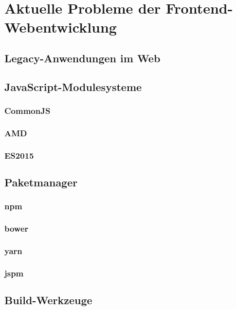 \chapter{Aktuelle Probleme der Frontend-Webentwicklung}
\label{cha:frontend-problems}


\section{Legacy-Anwendungen im Web}
\label{sec:legacy-applications}


\section{JavaScript-Modulesysteme}
\label{sec:js-modulesystems}

\subsection{CommonJS}
\label{sub:commonjs}
\subsection{AMD}
\label{sub:amd}
\subsection{ES2015}
\label{sub:es2015}


\section{Paketmanager}
\label{sec:package-managers}

\subsection{npm}
\label{sub:npm}
\subsection{bower}
\label{sub:bower}
\subsection{yarn}
\label{sub:yarn}
\subsection{jspm}
\label{sub:jspm}


\section{Build-Werkzeuge}
\label{sec:build-tools}

